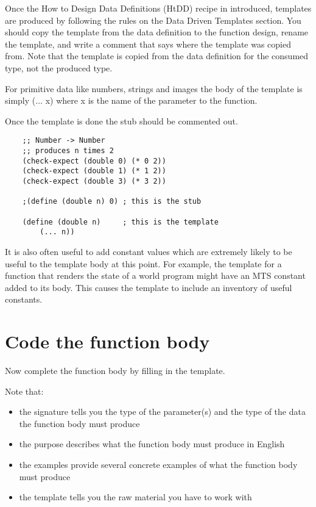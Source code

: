 \documentclass[11pt,a4paper]{report}
\begin{document}
	Once the How to Design Data Definitions (HtDD) recipe in introduced, templates are produced by
	following the rules on the Data Driven Templates section. You should copy the template from
	the data definition to the function design, rename the template, and write a comment that says
	where the template was copied from. Note that the template is copied from the data definition for
	the consumed type, not the produced type.
	
	For primitive data like numbers, strings and images the body of the template is simply ($\ldots$ x)
	where x is the name of the parameter to the function.
	
	Once the template is done the stub should be commented out.
	
	\begin{verbatim}
	;; Number -> Number
	;; produces n times 2
	(check-expect (double 0) (* 0 2))
	(check-expect (double 1) (* 1 2))
	(check-expect (double 3) (* 3 2))
	
	;(define (double n) 0) ; this is the stub
	
	(define (double n)     ; this is the template
		(... n))
	\end{verbatim}
	
	It is also often useful to add constant values which are extremely likely to be useful to the
	template body at this point. For example, the template for a function that renders the state of a
	world program might have an MTS constant added to its body. This causes the template to
	include an inventory of useful constants.
	
	\section{Code the function body}
	Now complete the function body by filling in the template.

	Note that:
	
	\begin{itemize}
		\item the signature tells you the type of the parameter(s) and the type of the data the function body
		must produce
		\item the purpose describes what the function body must produce in English
		\item the examples provide several concrete examples of what the function body must produce
		\item the template tells you the raw material you have to work with
	\end{itemize}
\end{document}
